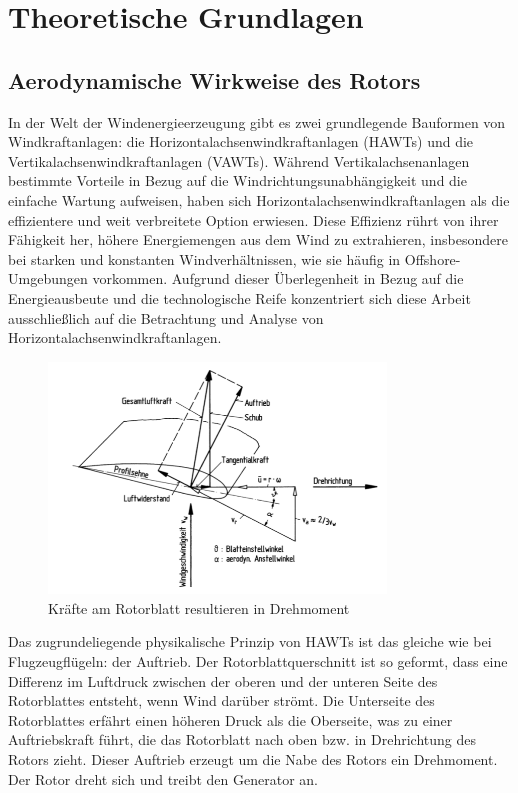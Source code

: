 \chapter{Theoretische Grundlagen}

\section{Aerodynamische Wirkweise des Rotors}
In der Welt der Windenergieerzeugung gibt es zwei grundlegende Bauformen von Windkraftanlagen: die Horizontalachsenwindkraftanlagen (HAWTs) und die Vertikalachsenwindkraftanlagen (VAWTs). Während Vertikalachsenanlagen bestimmte Vorteile in Bezug auf die Windrichtungsunabhängigkeit und die einfache Wartung aufweisen, haben sich Horizontalachsenwindkraftanlagen als die effizientere und weit verbreitete Option erwiesen. Diese Effizienz rührt von ihrer Fähigkeit her, höhere Energiemengen aus dem Wind zu extrahieren, insbesondere bei starken und konstanten Windverhältnissen, wie sie häufig in Offshore-Umgebungen vorkommen. Aufgrund dieser Überlegenheit in Bezug auf die Energieausbeute und die technologische Reife konzentriert sich diese Arbeit ausschließlich auf die Betrachtung und Analyse von Horizontalachsenwindkraftanlagen.

\begin{figure}[htbp] %
    \centering %
    \includegraphics[width=0.8\textwidth]{figures/kraft_an_blatt.png} %
    \caption{Kräfte am Rotorblatt resultieren in Drehmoment \cite{hau_physikalische_2016}} %
    \label{fig:kraft_an_blatt} %
\end{figure}

Das zugrundeliegende physikalische Prinzip von HAWTs ist das gleiche wie bei Flugzeugflügeln: der Auftrieb.
Der Rotorblattquerschnitt ist so geformt, dass eine Differenz im Luftdruck zwischen der oberen und der unteren Seite des Rotorblattes entsteht, wenn Wind darüber strömt.
Die Unterseite des Rotorblattes erfährt einen höheren Druck als die Oberseite, was zu einer Auftriebskraft führt, die das Rotorblatt nach oben bzw. in Drehrichtung des Rotors zieht.
Dieser Auftrieb erzeugt um die Nabe des Rotors ein Drehmoment. Der Rotor dreht sich und treibt den Generator an.


